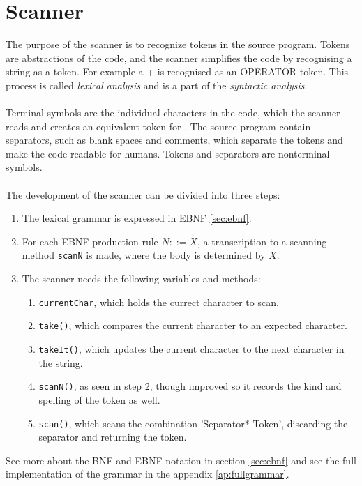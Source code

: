 \section{Scanner}
\label{sec:scannertheory}
The purpose of the scanner is to recognize tokens in the source program. Tokens are abstractions of the code, and the scanner simplifies the code by recognising a string as a token. For example a + is recognised as an OPERATOR token. This process is called \textit{lexical analysis} and is a part of the \textit{syntactic analysis}.
\\
\\
Terminal symbols are the individual characters in the code, which the scanner reads and creates an equivalent token for \cite{misc:spo}. The source program contain separators, such as blank spaces and comments, which separate the tokens and make the code readable for humans. Tokens and separators are nonterminal symbols.
\\
\\
The development of the scanner can be divided into three steps:
\begin{enumerate}
\item The lexical grammar is expressed in EBNF \ref{sec:ebnf}.
\item For each EBNF production rule $N::=X$, a transcription to a scanning method \texttt{scanN} is made, where the body is determined by $X$.
\item The scanner needs the following variables and methods: 
\begin{enumerate}
\item \texttt{currentChar}, which holds the currect character to scan.
\item \texttt{take()}, which compares the current character to an expected character.
\item \texttt{takeIt()}, which updates the current character to the next character in the string.
\item \texttt{scanN()}, as seen in step 2, though improved so it records the kind and spelling of the token as well.
\item \texttt{scan()}, which scans the combination 'Separator* Token', discarding the separator and returning the token.
\end{enumerate}
\end{enumerate}

See more about the BNF and EBNF notation in section \ref{sec:ebnf} and see the full implementation of the grammar in the appendix \ref{ap:fullgrammar}.
